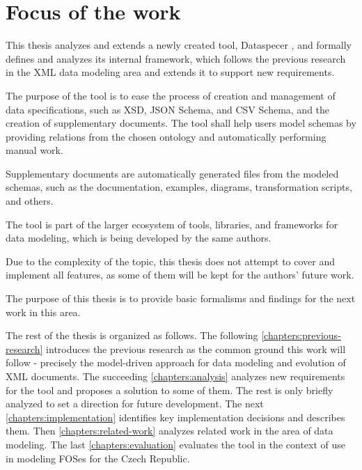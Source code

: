 \section*{Focus of the work}

This thesis analyzes and extends a newly created tool, Dataspecer \cite{dataspecer}, and formally defines and analyzes its internal framework, which follows the previous research \cite{necasky2007xsem, necasky2012conceptual, nevcasky2012evolution, xcase, exolutio} in the XML data modeling area and extends it to support new requirements.

The purpose of the tool is to ease the process of creation and management of data specifications, such as XSD, JSON Schema, and CSV Schema, and the creation of supplementary documents. The tool shall help users model schemas by providing relations from the chosen ontology and automatically performing manual work.

Supplementary documents are automatically generated files from the modeled schemas, such as the documentation, examples, diagrams, transformation scripts, and others.

\medskip

The tool is part of the larger ecosystem of tools, libraries, and frameworks for data modeling, which is being developed by the same authors.

Due to the complexity of the topic, this thesis does not attempt to cover and implement all features, as some of them will be kept for the authors' future work.

The purpose of this thesis is to provide basic formalisms and findings for the next work in this area.

\bigskip

The rest of the thesis is organized as follows. The following \autoref{chapters:previous-research} introduces the previous research as the common ground this work will follow - precisely the model-driven approach for data modeling and evolution of XML documents. The succeeding \autoref{chapters:analysis} analyzes new requirements for the tool and proposes a solution to some of them. The rest is only briefly analyzed to set a direction for future development. The next \autoref{chapters:implementation} identifies key implementation decisions and describes them. Then \autoref{chapters:related-work} analyzes related work in the area of data modeling. The last \autoref{chapters:evaluation} evaluates the tool in the context of use in modeling FOSes for the Czech Republic.
